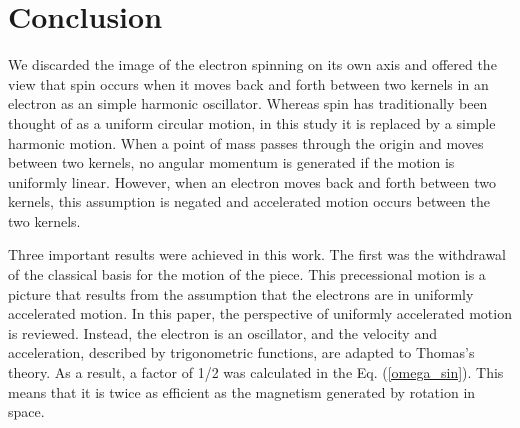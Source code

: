 \documentclass[%
 reprint,
 amsmath,amssymb,
 aps,
]{revtex4-1}
\numberwithin{equation}{section}%
\begin{document}
\section{Conclusion}




We discarded the image of the electron spinning on its own axis and offered the view that spin occurs when it moves back and forth between two kernels in an electron as an simple harmonic oscillator. Whereas spin has traditionally been thought of as a uniform circular motion, in this study it is replaced by a simple harmonic motion. When a point of mass passes through the origin and moves between two kernels, no angular momentum is generated if the motion is uniformly linear. However, when an electron moves back and forth between two kernels, this assumption is negated and accelerated motion occurs between the two kernels.

Three important results were achieved in this work. The first was the withdrawal of the classical basis for the motion of the piece. This precessional motion is a picture that results from the assumption that the electrons are in uniformly accelerated motion. In this paper, the perspective of uniformly accelerated motion is reviewed. Instead, the electron is an oscillator, and the velocity and acceleration, described by trigonometric functions, are adapted to Thomas's theory. As a result, a factor of 1/2 was calculated in the Eq. (\ref{omega_sin}). This means that it is twice as efficient as the magnetism generated by rotation in space.
\end{document}

